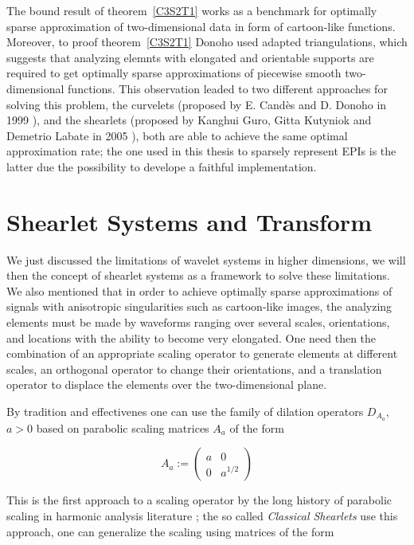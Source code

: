 \bigskip

The bound result of theorem~\ref{C3S2T1} works as a benchmark for optimally sparse approximation of two-dimensional data in form of cartoon-like functions. Moreover, to proof theorem~\ref{C3S2T1} Donoho used adapted triangulations, which suggests that analyzing elemnts with elongated and orientable supports are required to get optimally sparse approximations of piecewise smooth two-dimensional functions. This observation leaded to two different approaches for solving this problem, the curvelets (proposed by E. Candès and D. Donoho in 1999 \cite{Curvelets}), and the shearlets (proposed by Kanghui Guro, Gitta Kutyniok and Demetrio Labate in 2005 \cite{FirstShearlets}), both are able to achieve the same optimal approximation rate; the one used in this thesis to sparsely represent EPIs is the latter due the possibility to develope a faithful implementation. 

\section{Shearlet Systems and Transform}

We just discussed the limitations of wavelet systems in higher dimensions, we will then the concept of shearlet systems as a framework to solve these limitations. We also mentioned that in order to achieve optimally sparse approximations of signals with anisotropic singularities such as cartoon-like images, the analyzing elements must be made by waveforms ranging over several scales, orientations, and locations with the ability to become very elongated. One need then the combination of an appropriate scaling operator to generate elements at different scales, an orthogonal operator to change their orientations, and a translation operator to displace the elements over the two-dimensional plane. 

\bigskip

By tradition and effectivenes one can use the family of dilation operators $D_{A_a}$, $a>0$ based on parabolic scaling matrices $A_a$ of the form

\begin{equation}
\label{eq:scaling}
A_a:=
\left(
\begin{matrix}
a & 0 \\
0 & a^{1/2}
\end{matrix}
\right)
\end{equation}

This is the first approach to a scaling operator by the long history of parabolic scaling in harmonic analysis literature \cite{Fefferman}; the so called \textit{Classical Shearlets} use this approach, one can generalize the scaling using matrices of the form 

